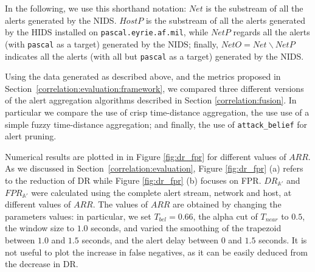 In the following, we use this shorthand notation: $Net$ is the
substream of all the alerts generated by the
\ac{NIDS}. $HostP$ is the substream of all the alerts
generated by the \ac{HIDS} installed on
\texttt{pascal.\-eyrie.\-af.\-mil}, while $NetP$ regards all the
alerts (with \texttt{pascal} as a target) generated by the
\ac{NIDS}; finally, $NetO = Net \backslash NetP$ indicates
all the alerts (with all but \texttt{pascal} as a target) generated by
the \ac{NIDS}.

Using the data generated as described above, and the metrics proposed
in Section~\ref{correlation:evaluation:framework}, we compared three
different versions of the alert aggregation algorithms described in
Section \ref{correlation:fusion}. In particular we compare the use of
crisp time-distance aggregation, the use use of a simple fuzzy
time-distance aggregation; and finally, the use of
\texttt{attack\_belief} for alert pruning.

Numerical results are plotted in in Figure \ref{fig:dr_fpr} for
different values of $ARR$. As we discussed in
Section~\ref{correlation:evaluation}, Figure \ref{fig:dr_fpr} (a)
refers to the reduction of \ac{DR} while Figure \ref{fig:dr_fpr} (b)
focuses on \ac{FPR}. $DR_{\mathbb{A}'}$ and $FPR_{\mathbb{A}'}$ were
calculated using the complete alert stream, network and host, at
different values of $ARR$. The values of $ARR$ are obtained by
changing the parameters values: in particular, we set $T_{bel}=0.66$,
the alpha cut of $T_{near}$ to $0.5$, the window size to $1.0$
seconds, and varied the smoothing of the trapezoid between $1.0$ and
$1.5$ seconds, and the alert delay between $0$ and $1.5$ seconds. It
is not useful to plot the increase in false negatives, as it can be
easily deduced from the decrease in \ac{DR}.

